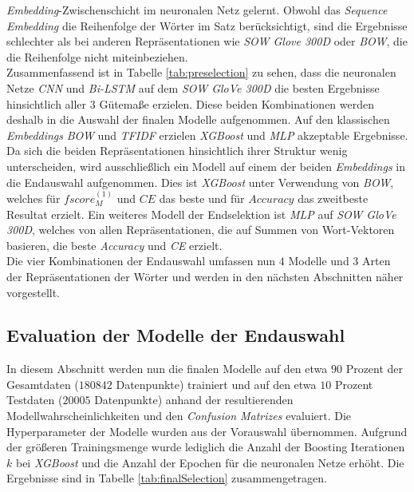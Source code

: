 \documentclass[a4paper,11pt]{article}
\begin{document}
\textit{Embedding}-Zwischenschicht im neuronalen Netz gelernt. Obwohl das \textit{Sequence} \textit{Embedding} die Reihenfolge der Wörter im Satz berücksichtigt, sind die Ergebnisse schlechter als bei anderen Repräsentationen wie \textit{SOW Glove 300D} oder \textit{BOW}, die die Reihenfolge nicht miteinbeziehen.\\

Zusammenfassend ist in Tabelle \ref{tab:preselection} zu sehen, dass die neuronalen Netze \textit{CNN} und \textit{Bi-LSTM} auf dem \textit{SOW GloVe 300D} die besten Ergebnisse hinsichtlich aller $3$ Gütemaße erzielen. Diese beiden Kombinationen werden deshalb in die Auswahl der finalen Modelle aufgenommen. Auf den klassischen \textit{Embeddings} \textit{BOW} und \textit{TFIDF} erzielen \textit{XGBoost} und \textit{MLP} akzeptable Ergebnisse. Da sich die beiden Repräsentationen hinsichtlich ihrer Struktur wenig unterscheiden, wird ausschließlich ein Modell auf einem der beiden \textit{Embeddings} in die Endauswahl aufgenommen. Dies ist \textit{XGBoost} unter Verwendung von \textit{BOW}, welches für $fscore_M^{(1)}$ und $CE$ das beste und für $Accuracy$ das zweitbeste Resultat erzielt. Ein weiteres Modell der Endselektion ist \textit{MLP} auf \textit{SOW GloVe 300D}, welches von allen Repräsentationen, die auf Summen von Wort-Vektoren basieren, die beste \textit{Accuracy} und \textit{CE} erzielt. \\

Die vier Kombinationen der Endauswahl umfassen nun $4$ Modelle und $3$ Arten der Repräsentationen der Wörter und werden in den nächsten Abschnitten näher vorgestellt.





\subsection{Evaluation der Modelle der Endauswahl} \label{kap:evalFinal}

In diesem Abschnitt werden nun die finalen Modelle auf den etwa $90$ Prozent der Gesamtdaten ($180842$ Datenpunkte) trainiert und auf den etwa $10$ Prozent Testdaten ($20005$ Datenpunkte) anhand der resultierenden Modellwahrscheinlichkeiten und den \textit{Confusion Matrizes} evaluiert. Die Hyperparameter der Modelle wurden aus der Vorauswahl übernommen. Aufgrund der größeren Trainingsmenge wurde lediglich die Anzahl der Boosting Iterationen $k$ bei \textit{XGBoost} und die Anzahl der Epochen für die neuronalen Netze erhöht. Die Ergebnisse sind in Tabelle \ref{tab:finalSelection} zusammengetragen. 
\end{document}
